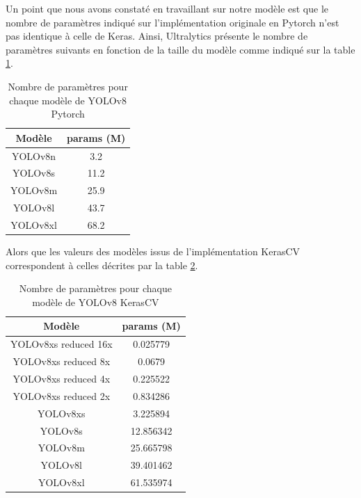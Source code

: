 Un point que nous avons constaté en travaillant sur notre modèle est que le nombre de paramètres indiqué sur l'implémentation originale en Pytorch n'est pas identique à celle de Keras. Ainsi, Ultralytics présente le nombre de paramètres suivants en fonction de la taille du modèle comme indiqué sur la table \ref{tab:nb_params_yolov8_pytorch}.

\begin{table}[!ht]
    \caption{Nombre de paramètres pour chaque modèle de YOLOv8 Pytorch}
    \label{tab:nb_params_yolov8_pytorch}
    \centering
    \begin{tabular}{ |c||c|  }
        \hline
        \rowcolor{gray!50}
        Modèle & params (M)\\
        \hline
        YOLOv8n & 3.2\\
        YOLOv8s & 11.2\\
        YOLOv8m & 25.9\\
        YOLOv8l & 43.7\\
        YOLOv8xl & 68.2\\
        \hline
    \end{tabular}
\end{table}

Alors que les valeurs des modèles issus de l'implémentation KerasCV correspondent à celles décrites par la table \ref{tab:nb_params_yolov8_kerascv}.

\begin{table}[!ht]
    \caption{Nombre de paramètres pour chaque modèle de YOLOv8 KerasCV}
    \label{tab:nb_params_yolov8_kerascv}
    \centering
    \begin{tabular}{ |c||c|  }
        \hline
        \rowcolor{gray!50}
        Modèle & params (M)\\
        \hline
        YOLOv8xs reduced 16x & 0.025779\\
        YOLOv8xs reduced 8x & 0.0679\\
        YOLOv8xs reduced 4x & 0.225522\\
        YOLOv8xs reduced 2x & 0.834286\\
        YOLOv8xs & 3.225894\\
        YOLOv8s & 12.856342\\
        YOLOv8m & 25.665798\\
        YOLOv8l & 39.401462\\
        YOLOv8xl & 61.535974\\
        \hline
    \end{tabular}
\end{table}

